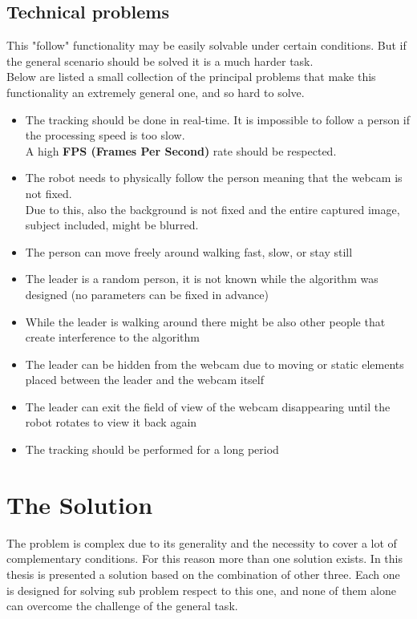 \subsection{Technical problems}\label{sec:technicalProblems}
This "follow" functionality may be easily solvable under certain conditions. But if the general scenario should be solved it is a much harder task.\\
Below are listed a small collection of the principal problems that make this functionality an extremely general one, and so hard to solve.
\begin{itemize}
	\item The tracking should be done in real-time. It is impossible to follow a person if the processing speed is too slow.\\
	      A high \textbf{FPS (Frames Per Second)} rate should be respected.
	\item The robot needs to physically follow the person meaning that the webcam is not fixed.\\
	      Due to this, also the background is not fixed and the entire captured image, subject included, might be blurred.
	\item The person can move freely around walking fast, slow, or stay still
	\item The leader is a random person, it is not known while the algorithm was designed (no parameters can be fixed in advance)
	\item While the leader is walking around there might be also other people that create interference to the algorithm
	\item The leader can be hidden from the webcam due to moving or static elements placed between the leader and the webcam itself
	\item The leader can exit the field of view of the webcam disappearing until the robot rotates to view it back again	
	\item The tracking should be performed for a long period
\end{itemize}


\section{The Solution}
The problem is complex due to its generality and the necessity to cover a lot of complementary conditions. For this reason more than one solution exists. In this thesis is presented a solution based on the combination of other three. Each one is designed for solving sub problem respect to this one, and none of them alone can overcome the challenge of the general task.\\

